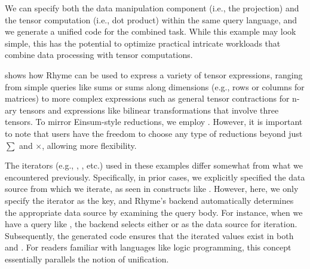 \documentclass[runningheads]{llncs}
\newcommand{\lang}{Rhyme}
\begin{document}
We can specify both the data manipulation component (i.e., the projection) and
the tensor computation (i.e., dot product) within the same query language, and
we generate a unified code for the combined task.
While this example may look simple, this has the potential to optimize practical
intricate workloads that combine data processing with tensor computations.

 shows how \lang{} can be used to express a variety of
tensor expressions, ranging from simple queries like sums or sums along
dimensions (e.g., rows or columns for matrices) to more complex expressions
such as general tensor contractions for n-ary tensors and expressions like
bilinear transformations that involve three tensors. 
To mirror Einsum-style reductions, we employ .
However, it is important to note that users have the freedom to choose
any type of reductions beyond just $\sum$ and $\times$, allowing more flexibility.

The iterators (e.g., \inline{*}, , etc.) used in these
examples differ somewhat from what we encountered previously.
Specifically, in prior cases, we explicitly specified the data source from which we iterate,
as seen in constructs like .
However, here, we only specify the iterator as the key, and \lang{}'s backend
automatically determines the appropriate data source by examining the query body.
For instance, when we have a query like , the
backend selects either  or  as the data source for iteration.
Subsequently, the generated code ensures that the iterated values exist in
both  and .
For readers familiar with languages like logic programming, this concept essentially
parallels the notion of unification.





\end{document}
